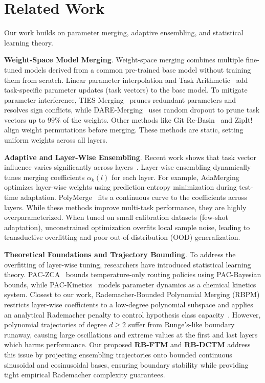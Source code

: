 \section{Related Work}
\label{sec:related_work}

Our work builds on parameter merging, adaptive ensembling, and statistical learning theory.

\textbf{Weight-Space Model Merging}. Weight-space merging combines multiple fine-tuned models derived from a common pre-trained base model without training them from scratch. Linear parameter interpolation and Task Arithmetic~\cite{wortsman2022model} add task-specific parameter updates (task vectors) to the base model. To mitigate parameter interference, TIES-Merging~\cite{yadav23ties} prunes redundant parameters and resolves sign conflicts, while DARE-Merging~\cite{yu23dare} uses random dropout to prune task vectors up to $99\%$ of the weights. Other methods like Git Re-Basin~\cite{ainsworth2022git} and ZipIt!~\cite{gallego2024mergekit} align weight permutations before merging. These methods are static, setting uniform weights across all layers.

\textbf{Adaptive and Layer-Wise Ensembling}. Recent work shows that task vector influence varies significantly across layers~\cite{choshen22fusing}. Layer-wise ensembling dynamically tunes merging coefficients $\alpha_k(l)$ for each layer. For example, AdaMerging~\cite{yang2024adamerging} optimizes layer-wise weights using prediction entropy minimization during test-time adaptation. PolyMerge~\cite{yang2024adamerging} fits a continuous curve to the coefficients across layers. While these methods improve multi-task performance, they are highly overparameterized. When tuned on small calibration datasets (few-shot adaptation), unconstrained optimization overfits local sample noise, leading to transductive overfitting and poor out-of-distribution (OOD) generalization.

\textbf{Theoretical Foundations and Trajectory Bounding}. To address the overfitting of layer-wise tuning, researchers have introduced statistical learning theory. PAC-ZCA~\cite{huang2026pac} bounds temperature-only routing policies using PAC-Bayesian bounds, while PAC-Kinetics~\cite{gomez2026pac} models parameter dynamics as a chemical kinetics system. Closest to our work, Rademacher-Bounded Polynomial Merging (RBPM) restricts layer-wise coefficients to a low-degree polynomial subspace and applies an analytical Rademacher penalty to control hypothesis class capacity~\cite{chatterjee2024robustness}. However, polynomial trajectories of degree $d \ge 2$ suffer from Runge's-like boundary runaway, causing large oscillations and extreme values at the first and last layers which harms performance. Our proposed \textbf{RB-FTM} and \textbf{RB-DCTM} address this issue by projecting ensembling trajectories onto bounded continuous sinusoidal and cosinusoidal bases, ensuring boundary stability while providing tight empirical Rademacher complexity guarantees.